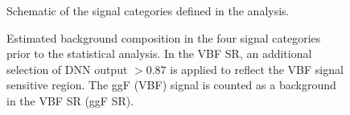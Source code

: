 \begin{figure}[ht]
    \caption{Schematic of the signal categories defined in the \HWW analysis.}
    \label{fig:signal-categorization}
\end{figure}
\begin{figure}[h!]
     \hfill
    \caption[Estimated background composition in the four signal categories.]{Estimated background composition in the four signal categories prior to the statistical analysis. In the VBF \TwoJet SR, an additional selection of DNN output $>0.87$ is applied to reflect the VBF signal sensitive region. The ggF (VBF) signal is counted as a background in the VBF SR (ggF SR).}
    \label{fig:bkg-composition}
\end{figure}

